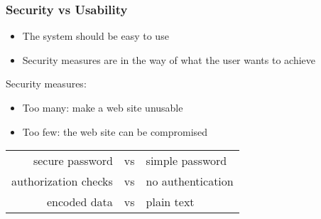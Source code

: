 \begin{frame}
\frametitle{Security vs Usability}
\begin{itemize}
\item The system should be easy to use
\item Security measures are in the way of what the user wants to achieve
\end{itemize}
Security measures:
\begin{itemize}
\item Too many: make a web site unusable
\item Too few: the web site can be compromised
\end{itemize}
\begin{example}
\begin{center}
\begin{tabular}{rcl}
secure password & vs & simple password \\
authorization checks & vs & no authentication \\
encoded data & vs & plain text \\
\end{tabular}
\end{center}
\end{example}
\end{frame}

